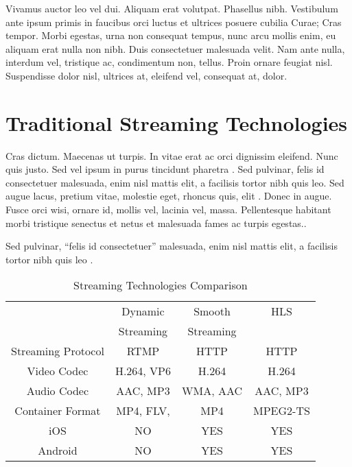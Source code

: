 \label{chap:back}


Vivamus auctor leo vel dui. Aliquam erat volutpat. Phasellus nibh. Vestibulum ante ipsum primis in faucibus orci luctus et ultrices posuere cubilia Curae; Cras tempor. Morbi egestas, urna non consequat tempus, nunc arcu mollis enim, eu aliquam erat nulla non nibh. Duis consectetuer malesuada velit. Nam ante nulla, interdum vel, tristique ac, condimentum non, tellus. Proin ornare feugiat nisl. Suspendisse dolor nisl, ultrices at, eleifend vel, consequat at, dolor.
\section{Traditional Streaming Technologies}
Cras dictum. Maecenas ut turpis. In vitae erat ac orci dignissim eleifend. Nunc quis justo. Sed vel ipsum in purus tincidunt pharetra \cite{MacAulay:2005fk}. Sed pulvinar, felis id consectetuer malesuada, enim nisl mattis elit, a facilisis tortor nibh quis leo. Sed augue lacus, pretium vitae, molestie eget, rhoncus quis, elit \cite{Schwarz:2007lr}. Donec in augue. Fusce orci wisi, ornare id, mollis vel, lacinia vel, massa. Pellentesque habitant morbi tristique senectus et netus et malesuada fames ac turpis egestas..

Sed pulvinar, \enquote{felis id consectetuer} malesuada, enim nisl mattis elit, a facilisis tortor nibh quis leo .

\begin{table}[htb]
\centering
\normalsize
{\footnotesize
    \caption{Streaming Technologies Comparison}
    \label{tab:streamingtech}
    \begin{tabular}{ | c | c | c | c |}
    \hline
    & Dynamic & Smooth & HLS\\
    & Streaming & Streaming & \\ \hline \hline

    Streaming Protocol & RTMP & HTTP & HTTP \\
    \hline
    
    Video Codec & H.264, VP6 & H.264 & H.264 \\ 
    \hline
    
    Audio Codec & AAC, MP3 & WMA, AAC & AAC, MP3  \\
    \hline
    
    Container Format & MP4, FLV, & MP4 & MPEG2-TS \\
    \hline
    
     iOS & NO & YES & YES \\ \hline
     
    Android & NO & YES & YES \\ \hline
    
    \end{tabular}
    }
\end{table} 

